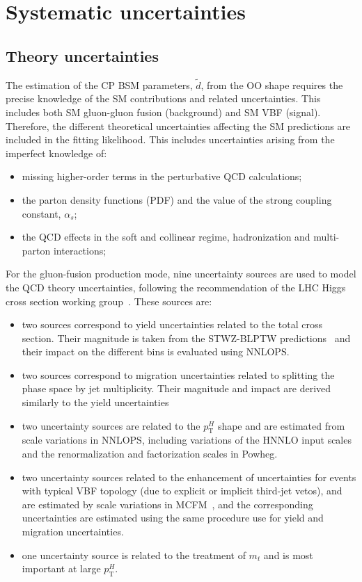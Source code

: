 \section{Systematic uncertainties}
\label{sec:syst}

\subsection{Theory uncertainties}
\label{ssec:theoryuncert}

The estimation of the CP BSM parameters, $\tilde{d}$, from the OO shape requires the precise knowledge of the SM contributions and related uncertainties. This includes both SM gluon-gluon fusion (background) and SM VBF (signal).
 Therefore, the different theoretical uncertainties affecting the SM predictions are included in the fitting likelihood. This includes uncertainties arising from the imperfect knowledge of:
 \begin{itemize}
 	\item missing higher-order terms in the perturbative QCD calculations;
 	\item the parton density functions (PDF) and the value of the strong coupling constant, $\alpha_{s}$;
 	\item the QCD effects in the soft and collinear regime, hadronization and multi-parton interactions;
 \end{itemize}

For the gluon-fusion production mode, nine uncertainty sources are used to model the QCD theory
uncertainties, following the recommendation of the LHC Higgs cross section working group~\cite{LHCXS_4}. These sources are:
\begin{itemize}
\item two sources correspond to yield uncertainties related to the total cross section. Their magnitude is taken from the
STWZ-BLPTW predictions~\cite{ggF_qcd_unc_1,ggF_qcd_unc_2,LHCXS_4} and their impact on the different bins is evaluated using
NNLOPS.
\item two sources correspond to migration uncertainties related to splitting the phase space by jet multiplicity. Their magnitude and impact are derived similarly to the yield uncertainties
\item two uncertainty sources are related to the $p_\mathrm{T}^H$ shape and are estimated from scale
variations in NNLOPS, including variations of the HNNLO input scales and the renormalization
and factorization scales in Powheg.
\item two uncertainty sources related to the enhancement of uncertainties for events with typical VBF topology (due to explicit or implicit third-jet vetos), and are estimated by scale variations in MCFM~\cite{MCFM}, and the corresponding uncertainties are estimated using the same procedure use for yield and migration uncertainties.
\item one uncertainty source is related to the treatment of $m_t$ and is most important at large $p_\mathrm{T}^H$.
\end{itemize}

